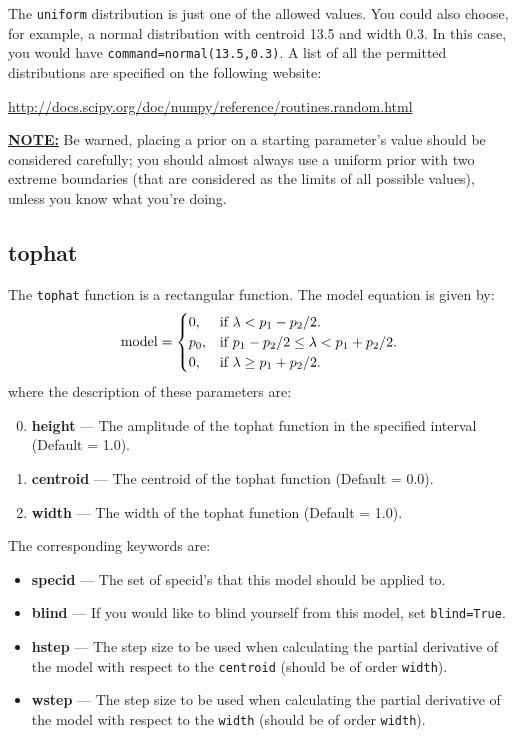 The \texttt{uniform} distribution is just one of the allowed values. You could
also choose, for example, a normal distribution with centroid 13.5 and width
0.3. In this case, you would have \texttt{command=normal(13.5,0.3)}. A list of
all the permitted distributions are specified on the following website:

\url{http://docs.scipy.org/doc/numpy/reference/routines.random.html}

\textbf{\underline{NOTE:}} Be warned, placing a prior on a starting parameter's value should
be considered carefully; you should almost always use a uniform prior with two extreme
boundaries (that are considered as the limits of all possible values), unless you know what
you're doing.

\subsection{tophat}

The \texttt{tophat} function is a rectangular function. The model equation is given by:
\begin{equation}
  {\rm model}=\begin{cases}
    0, & \text{if $\lambda < p_1 - p_2/2$}.\\
    p_0, & \text{if $p_1 - p_2/2 \le \lambda < p_1 + p_2/2$}.\\
    0, & \text{if $\lambda \ge p_1 + p_2/2$}.
  \end{cases}
\end{equation}
where the description of these parameters are:
\begin{enumerate}
\setcounter{enumi}{-1}
\item \textbf{height} --- The amplitude of the tophat function in the specified interval (Default = 1.0).
\item \textbf{centroid} --- The centroid of the tophat function (Default = 0.0).
\item \textbf{width} --- The width of the tophat function (Default = 1.0).
\end{enumerate}
The corresponding keywords are:
\begin{itemize}
\item \textbf{specid} --- The set of specid's that this model should be applied to.
\item \textbf{blind} --- If you would like to blind yourself from this model, set \texttt{blind=True}.
\item \textbf{hstep} --- The step size to be used when calculating the partial derivative of the model with respect to the  \texttt{centroid} (should be of order \texttt{width}).
\item \textbf{wstep} --- The step size to be used when calculating the partial derivative of the model with respect to the  \texttt{width} (should be of order \texttt{width}).
\end{itemize}


